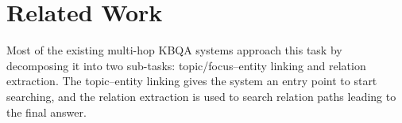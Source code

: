 \section{Related Work}

Most of the existing multi-hop KBQA systems \cite{DBLP:conf/acl/YuYHSXZ17,DBLP:journals/corr/abs-1801-09893,DBLP:conf/coling/ZhouHZ18,DBLP:conf/naacl/ChenCCNK19} approach this task by decomposing it into two sub-tasks:
topic/focus--entity linking and relation extraction. The topic--entity linking gives the system an entry point to start searching, and the relation extraction is used to search relation paths leading to the final answer. %
